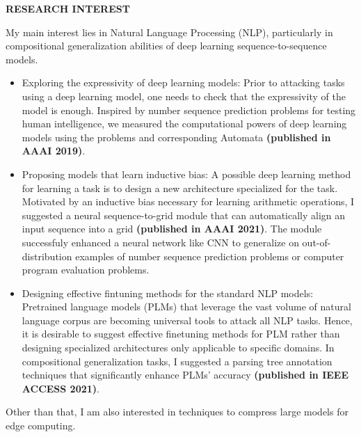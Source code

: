 \documentclass[12pt]{article}
\begin{document}
\vspace{0.2in} %



\begin{center}
	{\noindent \bfseries RESEARCH INTEREST}
    \noindent\makebox[\linewidth]{\rule{0.75\paperwidth}{0.4pt}}
\end{center}

\vspace{8pt} %
\setlength{\parindent}{0.5in}

\noindent 
My main interest lies in Natural Language Processing (NLP), particularly in compositional generalization abilities of deep learning sequence-to-sequence models.
\begin{itemize}
    \item Exploring the expressivity of deep learning models: Prior to attacking tasks using a deep learning model, one needs to check that the expressivity of the model is enough.
    Inspired by number sequence prediction problems for testing human intelligence, we measured the computational powers of deep learning models using the problems and corresponding Automata \textbf{(published in AAAI 2019)}.  
    \item Proposing models that learn inductive bias:
    A possible deep learning method for learning a task is to design a new architecture specialized for the task. 
    Motivated by an inductive bias necessary for learning arithmetic operations, I suggested a neural sequence-to-grid module that can automatically align an input sequence into a grid \textbf{(published in AAAI 2021)}.
    The module successfuly enhanced a neural network like CNN to generalize on out-of-distribution examples of number sequence prediction problems or computer program evaluation problems.
    \item Designing effective fintuning methods for the standard NLP models: Pretrained language models (PLMs) that leverage the vast volume of natural language corpus are becoming universal tools to attack all NLP tasks. Hence, it is desirable to suggest effective finetuning methods for PLM rather than designing specialized architectures only applicable to specific domains.
    In compositional generalization tasks, I suggested a parsing tree annotation techniques that significantly enhance PLMs' accuracy \textbf{(published in IEEE ACCESS 2021)}.  
\end{itemize}
Other than that, I am also interested in techniques to compress large models for edge computing.\\
\end{document}

